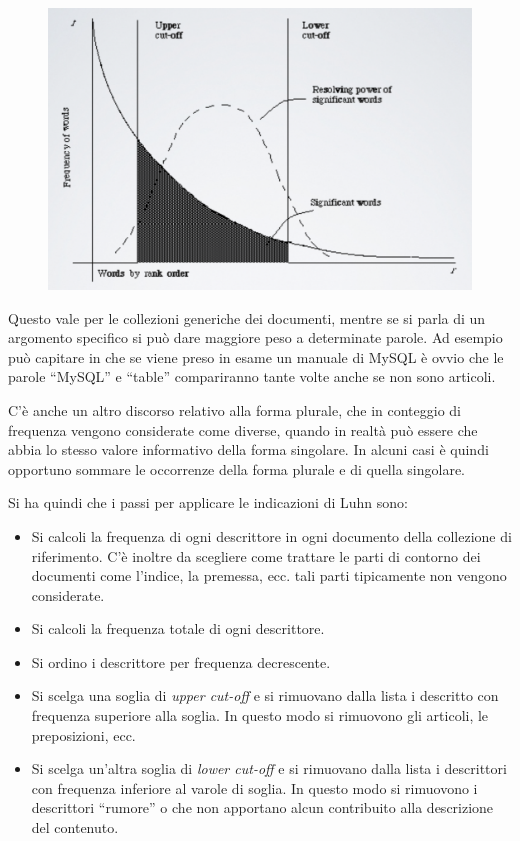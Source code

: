 \begin{figure}[htbp]
	\centering
	\includegraphics[width=0.55\linewidth]{images/l3-cutoff}
\end{figure}

Questo vale per le collezioni generiche dei documenti, mentre se si parla di un argomento specifico si può dare maggiore peso a determinate parole. Ad esempio può capitare in che se viene preso in esame un manuale di MySQL è ovvio che le parole ``MySQL'' e  ``table'' compariranno tante volte anche se non sono articoli.

C'è anche un altro discorso relativo alla forma plurale, che in conteggio di frequenza vengono considerate come diverse, quando in realtà può essere che abbia lo stesso valore informativo della forma singolare. In alcuni casi è quindi opportuno sommare le occorrenze della forma plurale e di quella singolare.

Si ha quindi che i passi per applicare le indicazioni di Luhn sono:

\begin{itemize}
	\item Si calcoli la frequenza di ogni descrittore in ogni documento della collezione di riferimento. C'è inoltre da scegliere come trattare le parti di contorno dei documenti come l'indice, la premessa, ecc. tali parti tipicamente non vengono considerate.
	\item Si calcoli la frequenza totale di ogni descrittore.
	\item Si ordino i descrittore per frequenza decrescente.
	\item Si scelga una soglia di \textit{upper cut-off} e si rimuovano dalla lista i descritto con frequenza superiore alla soglia. In questo modo si rimuovono gli articoli, le preposizioni, ecc.
	\item Si scelga un'altra soglia di \textit{lower cut-off} e si rimuovano dalla lista i descrittori con frequenza inferiore al varole di soglia. In questo modo si rimuovono i descrittori ``rumore''  o che non apportano alcun contribuito alla descrizione del contenuto.
\end{itemize}


